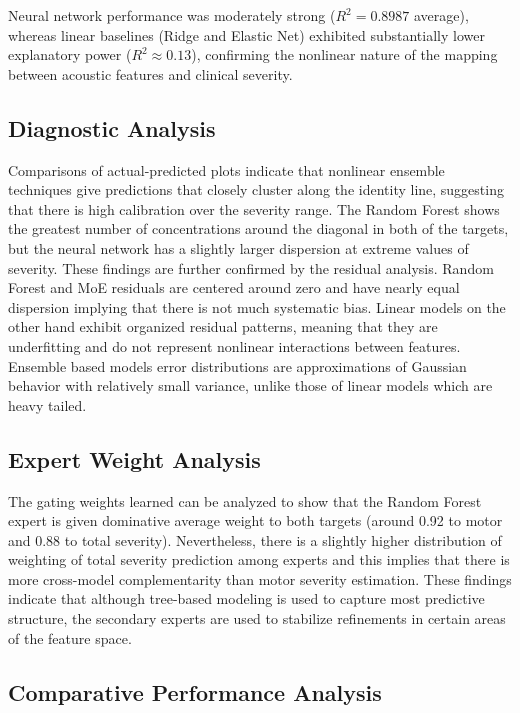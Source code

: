 \documentclass{customIEEEsingle}
\begin{document}
	Neural network performance was moderately strong ($R^2 = 0.8987$ average), whereas linear baselines (Ridge and Elastic Net) exhibited substantially lower explanatory power ($R^2 \approx 0.13$), confirming the nonlinear nature of the mapping between acoustic features and clinical severity.
	
	\subsection{Diagnostic Analysis}
	
	Comparisons of actual-predicted plots indicate that nonlinear ensemble techniques give predictions that closely cluster along the identity line, suggesting that there is high calibration over the severity range. The Random Forest shows the greatest number of concentrations around the diagonal in both of the targets, but the neural network has a slightly larger dispersion at extreme values of severity. These findings are further confirmed by the residual analysis. Random Forest and MoE residuals are centered around zero and have nearly equal dispersion implying that there is not much systematic bias. Linear models on the other hand exhibit organized residual patterns, meaning that they are underfitting and do not represent nonlinear interactions between features. 	Ensemble based models error distributions are approximations of Gaussian behavior with relatively small variance, unlike those of linear models which are heavy tailed.
	
	\subsection{Expert Weight Analysis}
	
	The gating weights learned can be analyzed to show that the Random Forest expert is given dominative average weight to both targets (around 0.92 to motor and 0.88 to total severity). Nevertheless, there is a slightly higher distribution of weighting of total severity prediction among experts and this implies that there is more cross-model complementarity than motor severity estimation. These findings indicate that although tree-based modeling is used to capture most predictive structure, the secondary experts are used to stabilize refinements in certain areas of the feature space.
	
	\subsection{Comparative Performance Analysis}
	
\end{document}
